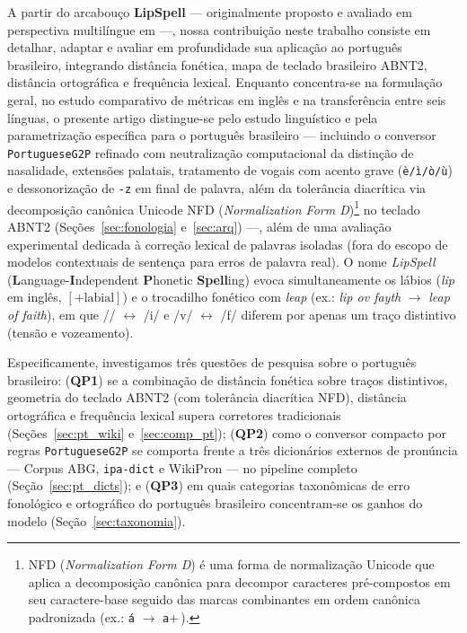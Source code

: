 \documentclass[a4paper, twocolumn, 11pt, twoside]{article}
\begin{document}
A partir do arcabouço \textbf{LipSpell} --- originalmente proposto e avaliado em perspectiva multilíngue em \citet{araujo2026lipspell} ---, nossa contribuição neste trabalho consiste em detalhar, adaptar e avaliar em profundidade sua aplicação ao português brasileiro, integrando distância fonética, mapa de teclado brasileiro ABNT2, distância ortográfica e frequência lexical. Enquanto \citet{araujo2026lipspell} concentra-se na formulação geral, no estudo comparativo de métricas em inglês e na transferência entre seis línguas, o presente artigo distingue-se pelo estudo linguístico e pela parametrização específica para o português brasileiro --- incluindo o conversor \texttt{PortugueseG2P} refinado com neutralização computacional da distinção de nasalidade, extensões palatais, tratamento de vogais com acento grave (\texttt{è/ì/ò/ù}) e dessonorização de \texttt{-z} em final de palavra, além da tolerância diacrítica via decomposição canônica Unicode NFD (\emph{Normalization Form D})\footnote{NFD (\emph{Normalization Form D}) é uma forma de normalização Unicode que aplica a decomposição canônica para decompor caracteres pré-compostos em seu caractere-base seguido das marcas combinantes em ordem canônica padronizada (ex.: \texttt{á} $\rightarrow$ \texttt{a}+\,\textasciiacute).} no teclado ABNT2 (Seções~\ref{sec:fonologia} e~\ref{sec:arq}) ---, além de uma avaliação experimental dedicada à correção lexical de palavras isoladas (fora do escopo de modelos contextuais de sentença para erros de palavra real). O nome \emph{LipSpell} (\textbf{L}anguage-\textbf{I}ndependent \textbf{P}honetic \textbf{Spell}ing) evoca simultaneamente os lábios (\textit{lip} em inglês, $[+\text{labial}]$) e o trocadilho fonético com \emph{leap} (ex.: \textit{lip ov fayth} $\rightarrow$ \textit{leap of faith}), em que /\textsci/ $\leftrightarrow$ /i/ e /v/ $\leftrightarrow$ /f/ diferem por apenas um traço distintivo (tensão e vozeamento).

Especificamente, investigamos três questões de pesquisa sobre o português brasileiro: (\textbf{QP1}) se a combinação de distância fonética sobre traços distintivos, geometria do teclado ABNT2 (com tolerância diacrítica NFD), distância ortográfica e frequência lexical supera corretores tradicionais (Seções~\ref{sec:pt_wiki} e~\ref{sec:comp_pt}); (\textbf{QP2}) como o conversor compacto por regras \texttt{PortugueseG2P} se comporta frente a três dicionários externos de pronúncia --- Corpus ABG, \texttt{ipa-dict} e WikiPron --- no pipeline completo (Seção~\ref{sec:pt_dicts}); e (\textbf{QP3}) em quais categorias taxonômicas de erro fonológico e ortográfico do português brasileiro concentram-se os ganhos do modelo (Seção~\ref{sec:taxonomia}).
\end{document}
